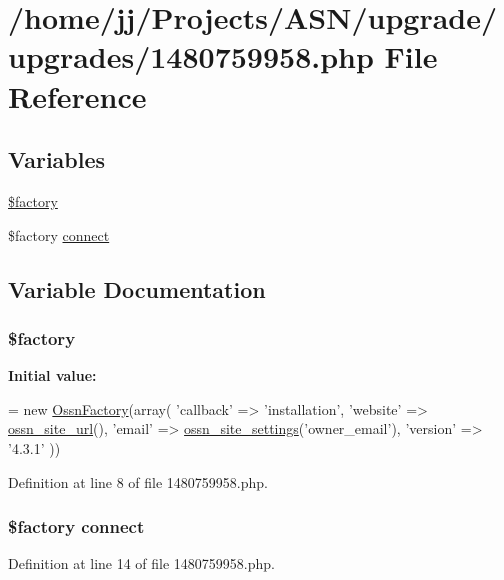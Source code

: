 \hypertarget{1480759958_8php}{}\section{/home/jj/\+Projects/\+A\+S\+N/upgrade/upgrades/1480759958.php File Reference}
\label{1480759958_8php}
\subsection*{Variables}
\begin{DoxyCompactItemize}
\item 
\hyperlink{1480759958_8php_a099b374dc664ee043fffcd6ea05e3e70}{\$factory}
\item 
\$factory \hyperlink{1480759958_8php_a3fdbedd7713e458f25fcf7dc1f562a3d}{connect}
\end{DoxyCompactItemize}


\subsection{Variable Documentation}
\subsubsection[{\texorpdfstring{\$factory}{$factory}}]{\setlength{\rightskip}{0pt plus 5cm}\$factory}\hypertarget{1480759958_8php_a099b374dc664ee043fffcd6ea05e3e70}{}\label{1480759958_8php_a099b374dc664ee043fffcd6ea05e3e70}
{\bfseries Initial value\+:}
\begin{DoxyCode}
= \textcolor{keyword}{new} \hyperlink{class_ossn_factory}{OssnFactory}(array(
        \textcolor{stringliteral}{'callback'} => \textcolor{stringliteral}{'installation'},
        \textcolor{stringliteral}{'website'} => \hyperlink{ossn_8lib_8system_8php_a2f12f9244f99eccd1225afb76ef2ab65}{ossn\_site\_url}(),
        \textcolor{stringliteral}{'email'} => \hyperlink{ossn_8lib_8system_8php_a610e2045b8a86c09f777b4d82e24e34c}{ossn\_site\_settings}(\textcolor{stringliteral}{'owner\_email'}),
        \textcolor{stringliteral}{'version'} => \textcolor{stringliteral}{'4.3.1'}
))
\end{DoxyCode}


Definition at line 8 of file 1480759958.\+php.

\subsubsection[{\texorpdfstring{connect}{connect}}]{\setlength{\rightskip}{0pt plus 5cm}\$factory connect}\hypertarget{1480759958_8php_a3fdbedd7713e458f25fcf7dc1f562a3d}{}\label{1480759958_8php_a3fdbedd7713e458f25fcf7dc1f562a3d}


Definition at line 14 of file 1480759958.\+php.

